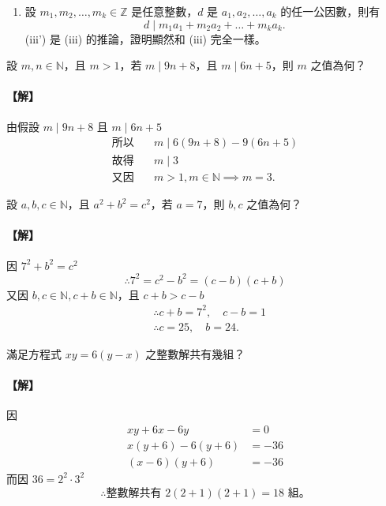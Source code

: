 \begin{enumerate}[(i')]
  \item 設 $m_1, m_2, \dots, m_k \in \mathbb{Z}$ 是任意整數，$d$ 是 $a_1, a_2, \dots, a_k$ 的任一公因數，則有
  \begin{equation*}
    d \mid m_1 a_1 + m_2 a_2 + \dots + m_k a_k.
  \end{equation*}
  (iii') 是 (iii) 的推論，證明顯然和 (iii) 完全一樣。
\end{enumerate}

\begin{example}\label{ex:6-1-4}
設 $m, n \in \mathbb{N}$，且 $m > 1$，若 $m \mid 9n+8$，且 $m \mid 6n+5$，則 $m$ 之值為何？

\paragraph{【解】}
由假設 $m \mid 9n+8$ 且 $m \mid 6n+5$
\begin{align*}
  \text{所以} \quad &m \mid 6(9n+8) - 9(6n+5) \\
  \text{故得} \quad &m \mid 3 \\
  \text{又因} \quad &m > 1, m \in \mathbb{N} \implies m=3.
\end{align*}
\end{example}

\begin{example}\label{ex:6-1-5}
設 $a, b, c \in \mathbb{N}$，且 $a^2+b^2=c^2$，若 $a=7$，則 $b, c$ 之值為何？

\paragraph{【解】}
因 $7^2+b^2=c^2$
\begin{equation*}
  \therefore 7^2 = c^2-b^2 = (c-b)(c+b)
\end{equation*}
又因 $b, c \in \mathbb{N}, c+b \in \mathbb{N}$，且 $c+b > c-b$
\begin{align*}
  &\therefore c+b = 7^2, \quad c-b = 1 \\
  &\therefore c=25, \quad b=24.
\end{align*}
\end{example}

\begin{example}\label{ex:6-1-6}
滿足方程式 $xy=6(y-x)$ 之整數解共有幾組？

\paragraph{【解】}
因
\begin{align*}
  xy+6x-6y &= 0 \\
  x(y+6)-6(y+6) &= -36 \\
  (x-6)(y+6) &= -36
\end{align*}
而因 $36 = 2^2 \cdot 3^2$
\begin{equation*}
  \therefore \text{整數解共有 } 2(2+1)(2+1) = 18 \text{ 組。}
\end{equation*}
\end{example}


